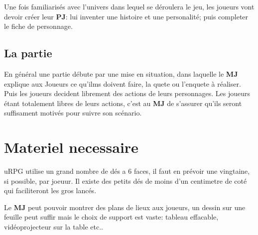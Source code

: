 Une fois familiarisés avec l'univers dans lequel se déroulera le jeu, les joueurs vont devoir créer leur \textbf{PJ}: lui inventer une histoire et une personalité; puis completer le fiche de personnage.



\subsection{La partie}


En général une partie débute par une mise en situation, dans laquelle le \textbf{MJ} explique aux Joueurs ce qu'ilms doivent faire, la quete ou l'enquete à réaliser. Puis les joueurs decident librement des actions de leurs personnages.
Les joueurs étant totalement libres de leurs actions, c'est au \textbf{MJ} de s'assurer qu'ils seront suffisament motivés pour suivre son scénario. 

\section{Materiel necessaire}

uRPG utilise un grand nombre de dés a 6 faces, il faut en prévoir une vingtaine, si possible, par joeuur. Il existe des petits dés de moins d'un centimetre de coté qui faciliteront les gros lancés. 

Le \textbf{MJ} peut pouvoir montrer des plans de lieux aux joueurs, un dessin sur une feuille peut suffir mais le choix de support est vaste: tableau effacable, vidéoprojecteur sur la table etc..


 







